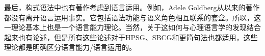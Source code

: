 
最后，构式语法中也有著作考虑到语言运用。例如，Adele Goldberg从\citeyear{Goldberg95a}以来的著作都没有离开语言运用事实。它包括语法功能与语义角色相互联系的套盒。所以，这一理论基本上也是一个语言能力理论。当然，关于这如何与心理语言学的发现结合起来也有论述，但是所有这些论述对于HPSG、SBCG和更简句法\citep[]{Jackendoff2011a}也都适用，这些理论都是明确区分语言能力/语言运用的。

